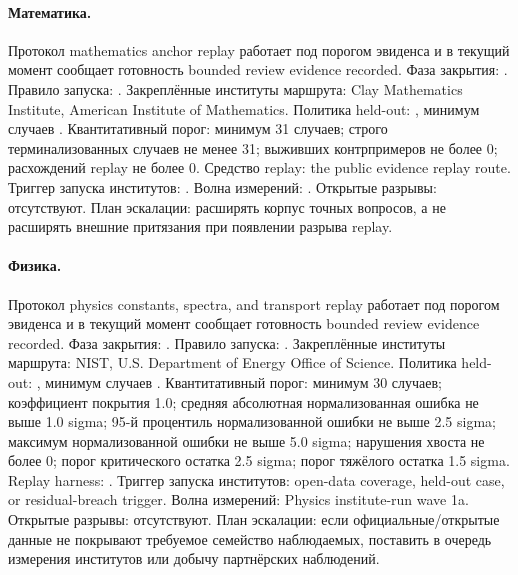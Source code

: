 \paragraph{Математика.}
Протокол mathematics anchor replay работает под порогом эвиденса  и в текущий момент сообщает готовность bounded review evidence recorded.
Фаза закрытия: . Правило запуска: .
Закреплённые институты маршрута: Clay Mathematics Institute, \allowbreak American Institute of Mathematics.
Политика held-out: , минимум случаев .
Квантитативный порог: минимум 31 случаев; строго терминализованных случаев не менее 31; выживших контрпримеров не более 0; расхождений replay не более 0.
Средство replay: the public evidence replay route.
Триггер запуска институтов: . Волна измерений: .
Открытые разрывы: отсутствуют.
План эскалации: расширять корпус точных вопросов, а не расширять внешние притязания при появлении разрыва replay.

\paragraph{Физика.}
Протокол physics constants, spectra, and transport replay работает под порогом эвиденса  и в текущий момент сообщает готовность bounded review evidence recorded.
Фаза закрытия: . Правило запуска: .
Закреплённые институты маршрута: NIST, \allowbreak U.S. Department of Energy Office of Science.
Политика held-out: , минимум случаев .
Квантитативный порог: минимум 30 случаев; коэффициент покрытия 1.0; средняя абсолютная нормализованная ошибка не выше 1.0 sigma; 95-й процентиль нормализованной ошибки не выше 2.5 sigma; максимум нормализованной ошибки не выше 5.0 sigma; нарушения хвоста не более 0; порог критического остатка 2.5 sigma; порог тяжёлого остатка 1.5 sigma.
Replay harness: .
Триггер запуска институтов: open-data coverage, held-out case, or residual-breach trigger. Волна измерений: Physics institute-run wave 1a.
Открытые разрывы: отсутствуют.
План эскалации: если официальные/открытые данные не покрывают требуемое семейство наблюдаемых, поставить в очередь измерения институтов или добычу партнёрских наблюдений.

